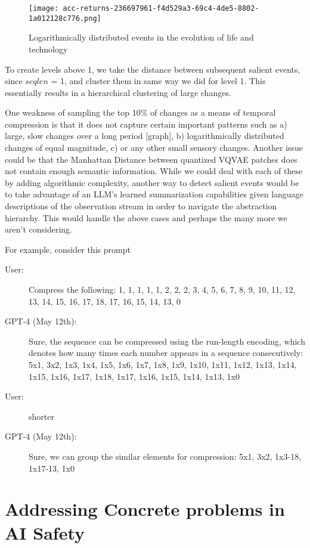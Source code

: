 \documentclass{article}
\begin{document}
\begin{figure}
    \centering
    \texttt{[image: acc-returns-236697961-f4d529a3-69c4-4de5-8802-1a012128c776.png]}
    \caption{ Logarithmically distributed events in the evolution of life and technology \cite{kurzweil1999age}}
    \label{fig:acc-returns}
\end{figure}

To create levels above 1, we take the distance between subsequent salient events, since $seqlen$ = 1, and cluster them in same way we did for level 1. This essentially results in a hierarchical clustering of large changes.

One weakness of sampling the top 10\% of changes as a means of temporal compression is that it does not capture certain important patterns such as a) large, slow changes over a long period [graph], b) logarithmically distributed changes of equal magnitude, c) or any other small sensory changes. Another issue could be that the Manhattan Distance between quantized VQVAE patches does not contain enough semantic information. While we could deal with each of these by adding algorithmic complexity, another way to detect salient events would be to take advantage of an LLM's learned summarization capabilities given language descriptions of the observation stream in order to navigate the abstraction hierarchy. This would handle the above cases and perhaps the many more we aren't considering.

For example, consider this prompt


\begin{description}
    \item[User:] Compress the following: 1, 1, 1, 1, 1, 2, 2, 2, 3, 4, 5, 6, 7, 8, 9, 10, 11, 12, 13, 14, 15, 16, 17, 18, 17, 16, 15, 14, 13, 0
    \item[GPT-4 (May 12th):] Sure, the sequence can be compressed using the run-length encoding, which denotes how many times each number appears in a sequence consecutively:
    5x1, 3x2, 1x3, 1x4, 1x5, 1x6, 1x7, 1x8, 1x9, 1x10, 1x11, 1x12, 1x13, 1x14, 1x15, 1x16, 1x17, 1x18, 1x17, 1x16, 1x15, 1x14, 1x13, 1x0
    \item[User:] shorter
    \item[GPT-4 (May 12th):] Sure, we can group the similar elements for compression: 5x1, 3x2, 1x3-18, 1x17-13, 1x0
\end{description}

\newpage

\section{Addressing Concrete problems in AI Safety}
\end{document}
